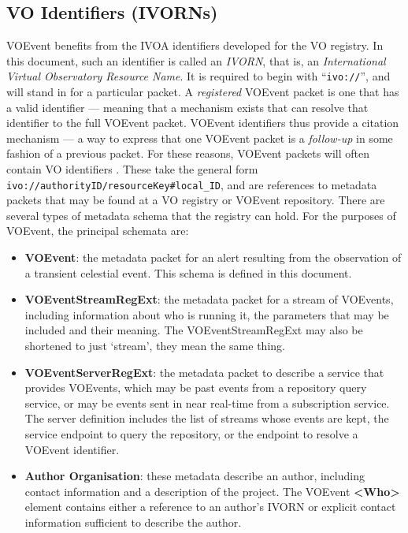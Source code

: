 \documentclass[11pt,a4paper]{ivoa}
\begin{document}
\subsection{VO Identifiers (IVORNs)}
\label{sec:2.2}
VOEvent benefits from the IVOA identifiers developed for the VO registry.
In this document, such
an identifier is called an \emph{IVORN}, that is, an \emph{International Virtual
Observatory Resource Name}. It is required to begin with ``\texttt{ivo://}'', and 
will stand in for a particular packet. A \emph{registered} VOEvent packet is one
that has a valid identifier --- meaning that a mechanism exists that can resolve
that identifier to the full VOEvent packet. VOEvent identifiers thus provide a 
citation mechanism --- a way to express that one VOEvent packet is a 
\emph{follow-up} in some fashion of a previous packet. For these reasons, 
VOEvent packets will often contain VO identifiers \citep{2016ivoa.spec.0523D}. 
These take the general form \texttt{ivo://authorityID/resourceKey\#local\_ID}, and
are references to metadata packets that may be found at a VO registry or VOEvent
repository. There are several types of metadata schema that the registry can
hold. For the purposes of VOEvent, the principal schemata are:
\begin{itemize}
\item {\bf VOEvent}: the metadata packet for an alert resulting from the
observation of a transient celestial event. This schema is defined in this
document.
\item {\bf VOEventStreamRegExt}: the metadata packet for a stream of VOEvents,
including information about who is running it, the parameters that may be
included and their meaning. The VOEventStreamRegExt may also be shortened to
just `stream', they mean the same thing.
\item {\bf VOEventServerRegExt}: the metadata packet to describe a service that
provides VOEvents, which may be past events from a repository query service, or
may be events sent in near real-time from a subscription service. The server
definition includes the list of streams whose events are kept, the service
endpoint to query the repository, or the endpoint to resolve a VOEvent
identifier.
\item {\bf Author Organisation}: these metadata \citep{2007ivoa.spec.0302H}
describe an author, including contact information and a description of the
project. The VOEvent {\bf <Who>} element contains either a reference to an
author's IVORN or explicit contact information sufficient to describe the
author.
\end{itemize}
\end{document}
